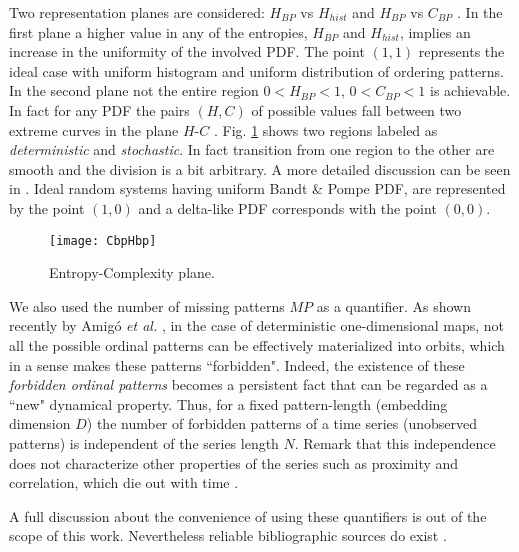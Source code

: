 Two representation planes are considered: $H_{BP}$ vs $H_{hist}$ \cite{DeMicco2008} and $H_{BP}$ vs $C_{BP}$ \cite{Rosso2007}.
In the first plane a higher value in any of the entropies, $H_{BP}$ and $H_{hist}$, implies an increase in the uniformity of the involved PDF.
The point $(1,1)$ represents the ideal case with uniform histogram and uniform distribution of ordering patterns.
In the second plane not the entire region $0<H_{BP}<1$, $0<C_{BP}<1$ is achievable.
In fact for any PDF the pairs $(H,C)$ of possible values fall between two extreme curves in the plane $H$-$C$ \cite{Anteneodo1996}.
Fig. \ref{fig:CbpHbp} shows two regions labeled as \textit{deterministic} and \textit{stochastic}.
In fact transition from one region to the other are smooth and the division is a bit arbitrary.
A more detailed discussion can be seen in \cite{Rosso2007}.
Ideal random systems having uniform Bandt \& Pompe PDF, are represented by the point $(1,0)$ \cite{Gonzalez2005} and a delta-like PDF corresponds with the point $(0,0)$.

\begin{figure}
	\texttt{[image: CbpHbp]}
	\caption{Entropy-Complexity plane.}
	\label{fig:CbpHbp}
\end{figure}

We also used the number of missing patterns $MP$ as a quantifier\cite{Rosso2012}.
As shown recently by Amig\'o {\it et al.} \cite{Amigo2006,Amigo2007,Amigo2008,Amigo2010}, in the case of deterministic one-dimensional maps, not all the possible ordinal patterns can be effectively materialized into orbits, which in a sense makes these patterns ``forbidden".
Indeed, the existence of these {\it forbidden ordinal patterns} becomes a persistent fact that can be regarded as a ``new" dynamical property.
Thus, for a fixed pattern-length (embedding dimension $D$) the number of forbidden patterns of a time series (unobserved patterns) is independent of the series length $N$.
Remark that this independence does not characterize other properties of the series such as proximity and correlation, which die out with time \cite{Amigo2007,Amigo2010}.

A full discussion about the convenience of using these quantifiers is out of the scope of this work.
Nevertheless reliable bibliographic sources do exist \cite{Wackerbauer1994,Lopez-Ruiz1995,Rosso2007A,DeMicco2008,Rosso2010,Martin2006,Rosso2012}.